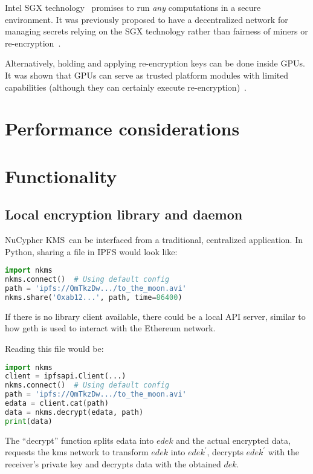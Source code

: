 \documentclass[longbibliography,nofootinbib]{revtex4-1}
\newcommand{\kms}{NuCypher KMS}
\begin{document}
Intel SGX technology~\cite{wiki:sgx} promises to run \emph{any} computations in a secure environment.
It was previously proposed to have a decentralized network for managing secrets relying on the SGX technology rather than fairness of
miners or re-encryption~\cite{sgx-blockchain-encryption}.

Alternatively, holding and applying re-encryption keys can be done inside GPUs.
It was shown that GPUs can serve as trusted platform modules with limited capabilities (although they can certainly execute
re-encryption)~\cite{gpu-trusted}.

\section{Performance considerations}

\section{Functionality}

\subsection{Local encryption library and daemon}

\kms~can be interfaced from a traditional, centralized application.
In Python, sharing a file in IPFS would look like:
\begin{lstlisting}[frame=single,language=Python]
import nkms
nkms.connect()  # Using default config
path = 'ipfs://QmTkzDw.../to_the_moon.avi'
nkms.share('0xab12...', path, time=86400)
\end{lstlisting}
If there is no library client available, there could be a local API server, similar to how geth is used to interact with the Ethereum network.

Reading this file would be:
\begin{lstlisting}[frame=single,language=Python]
import nkms
client = ipfsapi.Client(...)
nkms.connect()  # Using default config
path = 'ipfs://QmTkzDw.../to_the_moon.avi'
edata = client.cat(path)
data = nkms.decrypt(edata, path)
print(data)
\end{lstlisting}
The ``decrypt'' function splits edata into $edek$ and the actual encrypted data,
requests the kms network to transform $edek$ into $edek^{\prime}$,
decrypts $edek^{\prime}$ with the receiver's private key and
decrypts data with the obtained $dek$.
\end{document}
